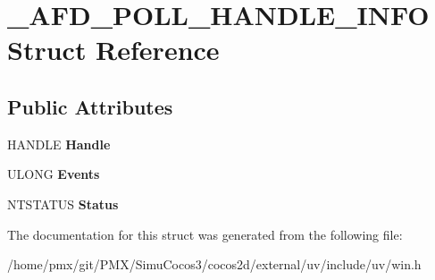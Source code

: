 \hypertarget{struct__AFD__POLL__HANDLE__INFO}{}\section{\+\_\+\+A\+F\+D\+\_\+\+P\+O\+L\+L\+\_\+\+H\+A\+N\+D\+L\+E\+\_\+\+I\+N\+FO Struct Reference}
\label{struct__AFD__POLL__HANDLE__INFO}
\subsection*{Public Attributes}
\begin{DoxyCompactItemize}
\item 
\mbox{\label{struct__AFD__POLL__HANDLE__INFO_a13a94587c7735f073021b09bc9a4b0c3}} 
H\+A\+N\+D\+LE {\bfseries Handle}
\item 
\mbox{\label{struct__AFD__POLL__HANDLE__INFO_ac961bebf9ed5ce1d22c3e28fa6abb797}} 
U\+L\+O\+NG {\bfseries Events}
\item 
\mbox{\label{struct__AFD__POLL__HANDLE__INFO_ad10790affcf1cc05ec8bcf12879b127b}} 
N\+T\+S\+T\+A\+T\+US {\bfseries Status}
\end{DoxyCompactItemize}


The documentation for this struct was generated from the following file\+:\begin{DoxyCompactItemize}
\item 
/home/pmx/git/\+P\+M\+X/\+Simu\+Cocos3/cocos2d/external/uv/include/uv/win.\+h\end{DoxyCompactItemize}
